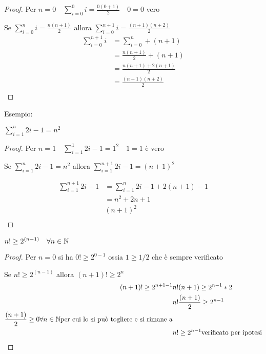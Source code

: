 \begin{proof}
Per $n = 0 \quad \displaystyle \sum_{i = 0} ^ 0 i = \frac{0(0 + 1)}{2} \quad 0 = 0$ vero

Se $\displaystyle \sum_{i = 0} ^ n i = \frac{n(n+1)}{2}$ allora
$\displaystyle \sum_{i = 0} ^ {n+1} i = \frac{(n+1)(n+2)}{2}$
\begin{equation*}
\begin{split}
  \sum_{i = 0}^{n+1} i & = \sum_{i = 0} ^ n + (n+1) \\
                     & = \frac{n(n+1)}{2} + (n+1) \\
                     & = \frac{n(n+1) + 2(n+1)}{2} \\
                     & = \frac{(n+1)(n+2)}{2} \\
\end{split}
\end{equation*}
\end{proof}

Esempio:\newline
\begin{thm}
 $\displaystyle \sum_{i = 1}^n 2i-1 = n^2$
\end{thm}

\begin{proof}
Per $n = 1 \quad \displaystyle \sum_{i = 1}^1 2i-1 = 1^2 \quad 1 = 1$ è vero

Se $\displaystyle \sum_{i = 1}^n 2i-1 = n^2$ allora
$\displaystyle \sum_{i = 1}^{n+1} 2i-1 = (n+1)^2$

\begin{equation*}
\begin{split}
  \sum_{i=1}^{n+1} 2i-1 & = \sum_{i=1}^n 2i-1 + 2(n+1) - 1 \\
         & = n^2 + 2n + 1 \\
         & (n+1)^2 \\
\end{split}
\end{equation*}
\end{proof}

\begin{thm}
    $\displaystyle n! \geq 2^{(n-1)} \quad \forall n \in \mathbb{N}$
\end{thm}
\begin{proof}
Per $n = 0$ si ha $0! \geq 2^{0-1}$ ossia $ 1 \geq 1/2$ che è sempre verificato

Se $n! \geq 2^{(n-1)}$ allora $(n+1)! \geq 2^n$
\begin{equation*}
\begin{split}
(n+1)! \geq 2^{n+1-1} & n! (n+1) \geq 2^{n-1} * 2 \\
                      & n! \frac{(n+1)}{2} \geq 2^{n-1} \\
\frac{(n+1)}{2} \geq 0 \forall n \in \mathbb{N} \text{per cui lo si può togliere e si rimane a}\\
                     & n! \geq 2^{n-1} \text{verificato per ipotesi} \\
\end{split}
\end{equation*}
\end{proof}


